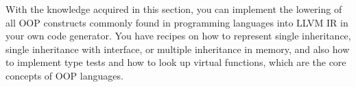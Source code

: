 With the knowledge acquired in this section, you can implement the lowering of all OOP constructs commonly found in programming languages into LLVM IR in your own code generator. You have recipes on how to represent single inheritance, single inheritance with interface, or multiple inheritance in memory, and also how to implement type tests and how to look up virtual functions, which are the core concepts of OOP languages.

















































